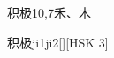 \begin{entry}{积极}{10,7}{⽲、⽊}
  \begin{phonetics}{积极}{ji1ji2}[][HSK 3]
  \end{phonetics}
\end{entry}
